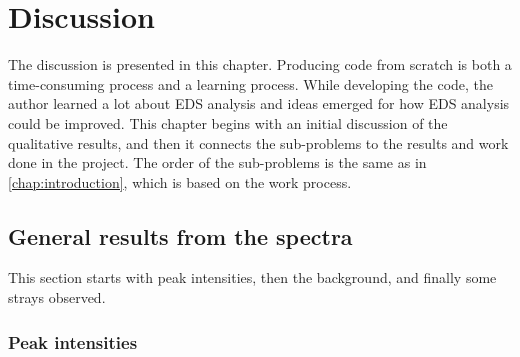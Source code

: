 \chapter{Discussion}
\label{chap:discussion}




The discussion is presented in this chapter.
Producing code from scratch is both a time-consuming process and a learning process.
While developing the code, the author learned a lot about EDS analysis and  ideas emerged for how EDS analysis could be improved.
This chapter begins with an initial discussion of the qualitative results, and then it connects the sub-problems to the results and work done in the project.
The order of the sub-problems is the same as in \cref{chap:introduction}, which is based on the work process.



\section{General results from the spectra}
\label{sec:discussion:general}

This section starts with peak intensities, then the background, and finally some strays observed.


\subsection{Peak intensities}
\label{sec:discussion:general:intensities}

